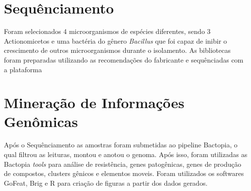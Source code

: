 \section{Sequênciamento}
Foram selecionados 4 microorganismos de espécies diferentes, sendo 3 Actionomicetos
e uma bactéria do gênero \textit{Bacillus} que foi capaz de inibir o crescimento de
outros microorganismos durante o isolamento. As bibliotecas foram preparadas utilizando
as recomendações do fabricante e sequênciadas com a plataforma %

\section{Mineração de Informações Genômicas}
Após o Sequênciamento as amostras foram submetidas ao pipeline Bactopia, o qual filtrou
as leituras, montou e anotou o genoma. Após isso, foram utilizadas as Bactopia \textit{tools}
para análise de resistência, genes patogênicas, genes de produção de compostos, clusters
gênicos e elementos moveis. 
Foram utilizados os softwares GoFeat, Brig e R para criação de figuras a partir dos dados gerados.
